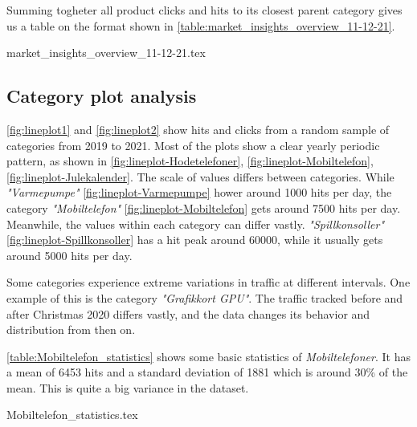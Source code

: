 Summing togheter all product clicks and hits to its closest parent category
gives us a table on the format shown in \autoref{table:market_insights_overview_11-12-21}.

{market_insights_overview_11-12-21.tex}

\subsection{Category plot analysis}
\autoref{fig:lineplot1} and \autoref{fig:lineplot2} show hits and clicks
from a random sample of categories from 2019 to 2021.
Most of the plots show a clear yearly periodic pattern, as shown in 
\autoref{fig:lineplot-Hodetelefoner},
\autoref{fig:lineplot-Mobiltelefon},
\autoref{fig:lineplot-Julekalender}.
The scale of values differs between categories.
While \textit{"Varmepumpe"} \autoref{fig:lineplot-Varmepumpe} hower around 1000 hits per day,
the category \textit{"Mobiltelefon"} \autoref{fig:lineplot-Mobiltelefon} gets around 7500 hits per day.
Meanwhile, the values within each category can differ vastly.
\textit{"Spillkonsoller"} \autoref{fig:lineplot-Spillkonsoller} has a hit peak around 60000,
while it usually gets around 5000 hits per day.

Some categories experience extreme variations in traffic at different intervals.
One example of this is the category \textit{"Grafikkort GPU"}.
The traffic tracked before and after Christmas 2020 differs vastly,
and the data changes its behavior and distribution from then on.

\autoref{table:Mobiltelefon_statistics} shows some basic statistics of \textit{Mobiltelefoner}.
It has a mean of 6453 hits and a standard deviation of 1881 which is
around 30\% of the mean. This is quite a big variance in the dataset.

{Mobiltelefon_statistics.tex}


